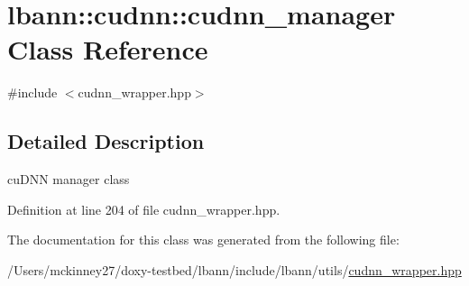 \hypertarget{classlbann_1_1cudnn_1_1cudnn__manager}{}\section{lbann\+:\+:cudnn\+:\+:cudnn\+\_\+manager Class Reference}
\label{classlbann_1_1cudnn_1_1cudnn__manager}


{\ttfamily \#include $<$cudnn\+\_\+wrapper.\+hpp$>$}



\subsection{Detailed Description}
cu\+D\+NN manager class 

Definition at line 204 of file cudnn\+\_\+wrapper.\+hpp.



The documentation for this class was generated from the following file\+:\begin{DoxyCompactItemize}
\item 
/\+Users/mckinney27/doxy-\/testbed/lbann/include/lbann/utils/\hyperlink{cudnn__wrapper_8hpp}{cudnn\+\_\+wrapper.\+hpp}\end{DoxyCompactItemize}
